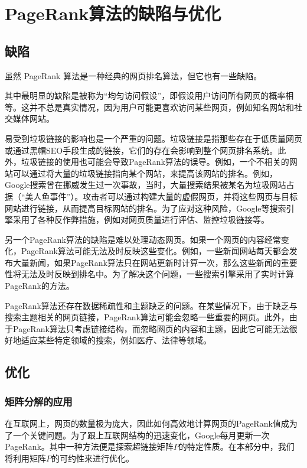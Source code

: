 \documentclass[UTF8,openany]{ctexbook}
\begin{document}
\chapter[PageRank算法的缺陷与优化]{PageRank算法的缺陷与优化}
\section[缺陷]{缺陷}
虽然 PageRank 算法是一种经典的网页排名算法，但它也有一些缺陷。

其中最明显的缺陷是被称为“均匀访问假设”，即假设用户访问所有网页的概率相等。这并不总是真实情况，因为用户可能更喜欢访问某些网页，例如知名网站和社交媒体网站。

易受到垃圾链接的影响也是一个严重的问题。垃圾链接是指那些存在于低质量网页或通过黑帽SEO手段生成的链接，它们的存在会影响到整个网页排名系统。此外，垃圾链接的使用也可能会导致PageRank算法的误导。例如，一个不相关的网站可以通过将大量的垃圾链接指向某个网站，来提高该网站的排名。例如，Google搜索曾在挪威发生过一次事故，当时，大量搜索结果被某名为垃圾网站占据（“美人鱼事件”）。攻击者可以通过构建大量的虚假网页，并将这些网页与目标网站进行链接，从而提高目标网站的排名。为了应对这种风险，Google等搜索引擎采用了各种反作弊措施，例如对网页质量进行评估、监控垃圾链接等。

另一个PageRank算法的缺陷是难以处理动态网页。如果一个网页的内容经常变化，PageRank算法可能无法及时反映这些变化。例如，一些新闻网站每天都会发布大量新闻，如果PageRank算法只在网站更新时计算一次，那么这些新闻的重要性将无法及时反映到排名中。为了解决这个问题，一些搜索引擎采用了实时计算PageRank的方法。

PageRank算法还存在数据稀疏性和主题缺乏的问题。在某些情况下，由于缺乏与搜索主题相关的网页链接，PageRank算法可能会忽略一些重要的网页。此外，由于PageRank算法只考虑链接结构，而忽略网页的内容和主题，因此它可能无法很好地适应某些特定领域的搜索，例如医疗、法律等领域。



\section[优化]{优化}
\subsection[矩阵分解的应用]{矩阵分解的应用}
在互联网上，网页的数量极为庞大，因此如何高效地计算网页的PageRank值成为了一个关键问题。为了跟上互联网结构的迅速变化，Google每月更新一次PageRank。其中一种方法便是探索超链接矩阵$P$的特定性质\cite{bi:DGPOLS}。在本部分中，我们将利用矩阵$P$的可约性来进行优化。
\end{document}

